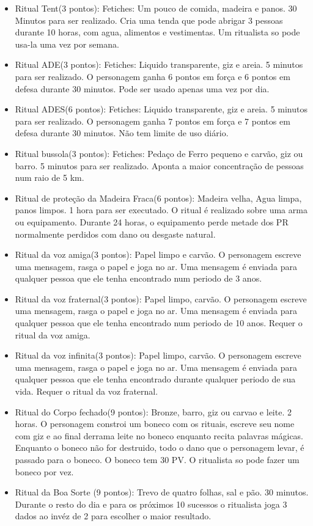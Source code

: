  
\begin{itemize}
	\item Ritual Tent(3 pontos): Fetiches: Um pouco de comida, madeira e panos. 30 Minutos para ser realizado. Cria uma tenda que pode abrigar 3 pessoas durante 10 horas, com agua, alimentos e vestimentas. Um ritualista so pode usa-la uma vez por semana.
 
 	\item Ritual ADE(3 pontos): Fetiches: Liquido transparente, giz e areia. 5 minutos para ser realizado. O personagem ganha 6 pontos em força e 6 pontos em defesa durante 30 minutos. Pode ser usado apenas uma vez por dia.
 
 	\item Ritual ADES(6 pontos): Fetiches: Liquido transparente, giz e areia. 5 minutos para ser realizado. O personagem ganha 7 pontos em força e 7 pontos em defesa durante 30 minutos. Não tem limite de uso diário.
 
 	\item Ritual bussola(3 pontos): Fetiches: Pedaço de Ferro pequeno e carvão, giz ou barro. 5 minutos para ser realizado. Aponta a maior concentração de pessoas num raio de 5 km.
 
 	\item Ritual de proteção da Madeira Fraca(6 pontos): Madeira velha, Agua limpa, panos limpos. 1 hora para ser executado. O ritual é realizado
 sobre uma arma ou equipamento. Durante 24 horas, o equipamento perde metade dos PR normalmente perdidos com dano ou desgaste natural.
 
 	\item Ritual da voz amiga(3 pontos): Papel limpo e carvão. O personagem escreve uma mensagem, rasga o papel e joga no ar. Uma mensagem é enviada para qualquer pessoa que ele tenha encontrado num periodo de 3 anos. 
 
 	\item Ritual da voz fraternal(3 pontos): Papel limpo, carvão. O personagem escreve uma mensagem, rasga o papel e joga no ar. Uma mensagem é enviada para qualquer pessoa que ele tenha encontrado num periodo de 10 anos. Requer o ritual da voz amiga.
 
 	\item Ritual da voz infinita(3 pontos): Papel limpo, carvão. O personagem escreve uma mensagem, rasga o papel e joga no ar. Uma mensagem é enviada para qualquer pessoa que ele tenha encontrado durante qualquer periodo de sua vida. Requer o ritual da voz fraternal.
 
 	\item Ritual do Corpo fechado(9 pontos): Bronze, barro, giz ou carvao e leite. 2 horas. O personagem constroi um boneco com os rituais, escreve seu nome com giz e ao final derrama leite no boneco enquanto recita palavras mágicas. Enquanto o boneco não for destruido, todo o dano que o personagem levar, é passado para o boneco. O boneco tem 30 PV. O ritualista so pode fazer um boneco por vez.
 
 	\item Ritual da Boa Sorte (9 pontos): Trevo de quatro folhas, sal e pão. 30 minutos. Durante o resto do dia e para os próximos 10 sucessos o ritualista joga 3 dados ao invéz de 2 para escolher o maior resultado.
\end{itemize}
 
